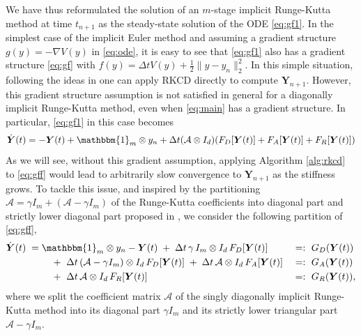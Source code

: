\documentclass[10pt,a4paper]{article}
\def \calA{\mathcal{A}}
\begin{document}
We have thus reformulated the solution of an $m$-stage implicit Runge-Kutta method at time $t_{n+1}$ as the steady-state solution of the  ODE \eqref{eq:gf1}. 
In the simplest case of the implicit Euler method and assuming a gradient structure $g(y)=-\nabla V(y)$ in \eqref{eq:ode}, it is easy to see that  \eqref{eq:gf1} also has a gradient structure \eqref{eq:gf} with 
$ f(y)=\Delta t V(y)+\frac12 \| y - y_n\|_2^2. $ 
In this simple situation, following the ideas in \cite{EVVZ21} one can apply RKCD directly to compute $\boldsymbol{Y}_{n+1}$. 
However, this gradient structure assumption is not satisfied in general for a diagonally implicit Runge-Kutta method, even when \eqref{eq:main} has a gradient structure. In particular, \eqref{eq:gf1} in this case becomes
\begin{equation} \label{eq:gff}
\dot {\boldsymbol{Y}}(t)=-\boldsymbol{Y}(t) +\mathbbm{1}_m \otimes y_n
	+
	\Delta t (\calA \otimes I_d)(F_{D}[{\boldsymbol{Y}}(t)]+F_{A}[{\boldsymbol{Y}}(t)]+F_{R}[{\boldsymbol{Y}}(t)])
\end{equation}
As we will see, without this gradient assumption, applying Algorithm \ref{alg:rkcd}  to \eqref{eq:gff} would lead to arbitrarily slow convergence to $\boldsymbol{Y}_{n+1}$ as the stiffness grows. To tackle this issue, and inspired by the partitioning $\calA=\gamma I_m+(\calA-\gamma I_m)$ of the Runge-Kutta coefficients into diagonal part and strictly lower diagonal part proposed in \cite {VSC92},
we consider the following partition of \eqref{eq:gff},
\begin{subequations} \label{eq:gff_part}
\begin{align}
\dot{{\boldsymbol{Y}}}(t) \;=\;& \mathbbm{1}_m \otimes y_n - {\boldsymbol{Y}}(t) \;+\; \Delta t\, \gamma\, I_m \otimes I_d \, F_D[ {\boldsymbol{Y}}(t)] &&=:~G_D( {\boldsymbol{Y}}(t))\\
&\quad +~ \Delta t\, (\calA-\gamma I_m)\otimes I_d \, F_D[ {\boldsymbol{Y}}(t)] \;+\; \Delta t\, \calA\otimes I_d \, F_A[{\boldsymbol{Y}}(t)] &&=:~G_A( {\boldsymbol{Y}}(t))\\
&\quad +~ \Delta t\,\calA\otimes I_d \, F_R[ {\boldsymbol{Y}}(t)] &&=:~G_R( {\boldsymbol{Y}}(t)),
\end{align}
\end{subequations}
where we split the coefficient matrix $\mathcal{A}$ of the
singly diagonally implicit Runge-Kutta method
into its diagonal part $\gamma I_m$ and its strictly lower triangular part $\mathcal{A}-\gamma I_m$. 
\end{document}
